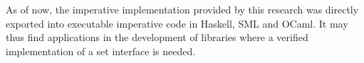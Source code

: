 \documentclass[runningheads]{llncs}
\newcommand{\btree}{B$^+$-tree}
\newcommand{\btrees}{B$^+$-trees}
\begin{document}
As of now, the imperative implementation provided by this research was
directly exported into executable imperative code in Haskell, SML and OCaml.
It may thus find applications in the development of
libraries where a verified implementation of a set interface is needed.









\end{document}
